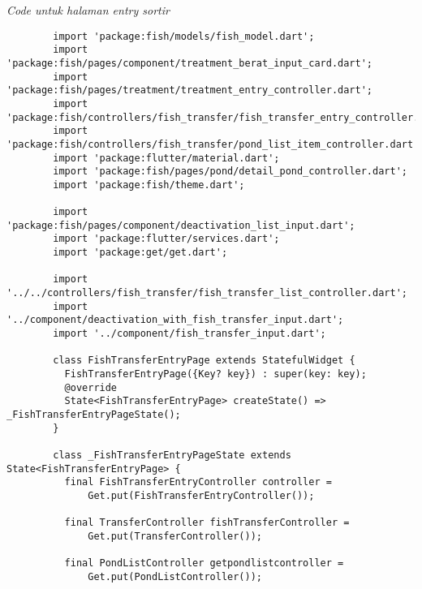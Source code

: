 	\textit{Code untuk halaman entry sortir}
	\begin{lstlisting}
        import 'package:fish/models/fish_model.dart';
        import 'package:fish/pages/component/treatment_berat_input_card.dart';
        import 'package:fish/pages/treatment/treatment_entry_controller.dart';
        import 'package:fish/controllers/fish_transfer/fish_transfer_entry_controller.dart';
        import 'package:fish/controllers/fish_transfer/pond_list_item_controller.dart';
        import 'package:flutter/material.dart';
        import 'package:fish/pages/pond/detail_pond_controller.dart';
        import 'package:fish/theme.dart';
        
        import 'package:fish/pages/component/deactivation_list_input.dart';
        import 'package:flutter/services.dart';
        import 'package:get/get.dart';
        
        import '../../controllers/fish_transfer/fish_transfer_list_controller.dart';
        import '../component/deactivation_with_fish_transfer_input.dart';
        import '../component/fish_transfer_input.dart';
        
        class FishTransferEntryPage extends StatefulWidget {
          FishTransferEntryPage({Key? key}) : super(key: key);
          @override
          State<FishTransferEntryPage> createState() => _FishTransferEntryPageState();
        }
        
        class _FishTransferEntryPageState extends State<FishTransferEntryPage> {
          final FishTransferEntryController controller =
              Get.put(FishTransferEntryController());
        
          final TransferController fishTransferController =
              Get.put(TransferController());
        
          final PondListController getpondlistcontroller =
              Get.put(PondListController());
        

\end{lstlisting}
